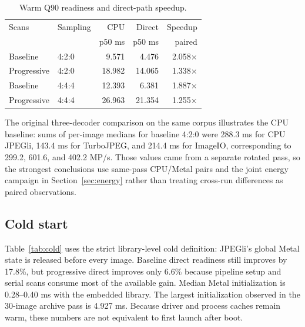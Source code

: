 \documentclass[10pt,twocolumn]{article}
\begin{document}
\begin{table}[t]
  \centering
  \caption{Warm Q90 readiness and direct-path speedup.}
  \label{tab:warm}
  \small
  \begin{tabular}{@{}llrrr@{}}
    \toprule
    Scans & Sampling & CPU & Direct & Speedup \\
          &          & p50 ms & p50 ms & paired \\
    \midrule
    Baseline    & 4:2:0 & 9.571  & 4.476  & 2.058$\times$ \\
    Progressive & 4:2:0 & 18.982 & 14.065 & 1.338$\times$ \\
    Baseline    & 4:4:4 & 12.393 & 6.381  & 1.887$\times$ \\
    Progressive & 4:4:4 & 26.963 & 21.354 & 1.255$\times$ \\
    \bottomrule
  \end{tabular}
\end{table}

The original three-decoder comparison on the same corpus illustrates the CPU
baseline: sums of per-image medians for baseline 4:2:0 were 288.3 ms for CPU
JPEGli, 143.4 ms for TurboJPEG, and 214.4 ms for ImageIO, corresponding to
299.2, 601.6, and 402.2 MP/s.  Those values came from a separate rotated pass,
so the strongest conclusions use same-pass CPU/Metal pairs and the joint
energy campaign in Section~\ref{sec:energy} rather than treating cross-run
differences as paired observations.

\subsection{Cold start}

Table~\ref{tab:cold} uses the strict library-level cold definition: JPEGli's
global Metal state is released before every image.  Baseline direct readiness
still improves by 17.8\%, but progressive direct improves only 6.6\% because
pipeline setup and serial scans consume most of the available gain.  Median
Metal initialization is 0.28--0.40 ms with the embedded library.  The largest
initialization observed in the 30-image archive pass is 4.927 ms.  Because
driver and process caches remain warm, these numbers are not equivalent to
first launch after boot.

\begin{table}[t]
  \centering
  \caption{Cold Q90 4:2:0 ready latency (ms).}
  \label{tab:cold}
  \small
\end{table}
\end{document}
